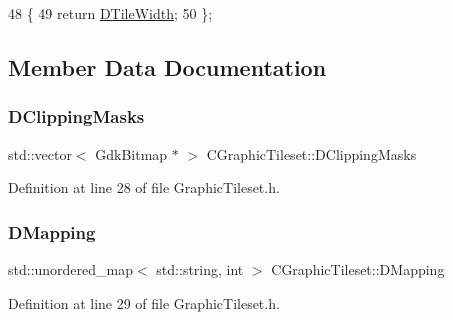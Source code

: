 \begin{DoxyCode}
48                              \{
49             \textcolor{keywordflow}{return} \hyperlink{classCGraphicTileset_a2d0c7d19865b81911a3a43d5cae50e00}{DTileWidth};
50         \};
\end{DoxyCode}


\subsection{Member Data Documentation}
\hypertarget{classCGraphicTileset_a3761aec1b9a8bf189da5a7202d7fcac9}{}\label{classCGraphicTileset_a3761aec1b9a8bf189da5a7202d7fcac9} 
\subsubsection{\texorpdfstring{D\+Clipping\+Masks}{DClippingMasks}}
{\footnotesize\ttfamily std\+::vector$<$ Gdk\+Bitmap $\ast$ $>$ C\+Graphic\+Tileset\+::\+D\+Clipping\+Masks\hspace{0.3cm}{\ttfamily [protected]}}



Definition at line 28 of file Graphic\+Tileset.\+h.

\hypertarget{classCGraphicTileset_a17cd13f68f77ea4976b59b37b10e914b}{}\label{classCGraphicTileset_a17cd13f68f77ea4976b59b37b10e914b} 
\subsubsection{\texorpdfstring{D\+Mapping}{DMapping}}
{\footnotesize\ttfamily std\+::unordered\+\_\+map$<$ std\+::string, int $>$ C\+Graphic\+Tileset\+::\+D\+Mapping\hspace{0.3cm}{\ttfamily [protected]}}



Definition at line 29 of file Graphic\+Tileset.\+h.

\hypertarget{classCGraphicTileset_a5d5adfcdbb347a6df3f57535ca08e3ef}{}\label{classCGraphicTileset_a5d5adfcdbb347a6df3f57535ca08e3ef} 
